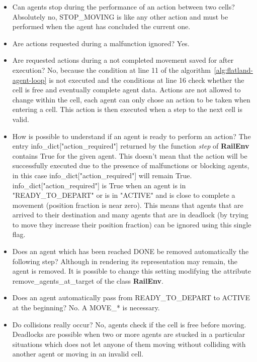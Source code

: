 \documentclass[11pt, a4paper, hidelinks]{report}
\begin{document}
\begin{itemize}
	\item Can agents stop during the performance of an action between two cells?
Absolutely no, STOP\_MOVING is like any other action and must be performed when the agent has concluded the current one.
	\item Are actions requested during a malfunction ignored?
Yes.
	\item Are requested actions during a not completed movement saved for after execution?
No, because the condition at line 11 of the algorithm~\ref{alg:flatland-agent-loop} is not executed and the conditions at line 16 check whether the cell is free and eventually complete agent data.
Actions are not allowed to change within the cell, each agent can only chose an action to be taken when entering a cell.
This action is then executed when a step to the next cell is valid.
	\item How is possible to understand if an agent is ready to perform an action?
The entry info\_dict["action\_required"] returned by the function \textit{step} of \textbf{RailEnv} contains True for the given agent.
This doesn't mean that the action will be successfully executed due to the presence of malfunctions or blocking agents, in this case info\_dict["action\_required"] will remain True.
info\_dict["action\_required"] is True when an agent is in "READY\_TO\_DEPART" or is in "ACTIVE" and is close to complete a movement (position fraction is near zero).
This means that agents that are arrived to their destination and many agents that are in deadlock (by trying to move they increase their position fraction) can be ignored using this single flag.
	\item Does an agent which has been reached DONE be removed automatically the following step?
Although in rendering its representation may remain, the agent is removed.
It is possible to change this setting modifying the attribute remove\_agents\_at\_target of the class \textbf{RailEnv}.
	\item Does an agent automatically pass from READY\_TO\_DEPART to ACTIVE at the beginning?
No. A MOVE\_* is necessary.
	\item Do collisions really occur?
No, agents check if the cell is free before moving.
Deadlocks are possible when two or more agents are stucked in a particular situations which does not let anyone of them moving without colliding with another agent or moving in an invalid cell.
\end{itemize}
\end{document}
